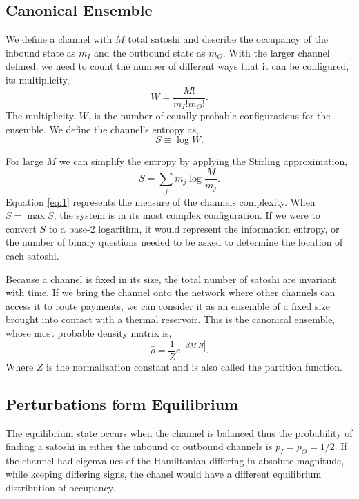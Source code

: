\documentclass[review,12pt]{elsarticle}
\begin{document}
\subsection{Canonical Ensemble}
We define a channel with $M$ total satoshi and describe the occupancy of the inbound state as $m_I$ and the outbound state as $m_O$.
With the larger channel defined, we need to count the number of different ways that it can be configured, its multiplicity,
\begin{equation}
  W = \frac{M!}{m_I!m_O!}. \nonumber
\end{equation}
The multiplicity, $W$, is the number of equally probable configurations for the ensemble.
We define the channel's entropy as,
\begin{equation}
  S \equiv \log W. \nonumber
\end{equation}

For large $M$ we can simplify the entropy by applying the Stirling approximation,
\begin{equation}
  S = \sum_j m_j \log\frac{M}{m_j}.\label{eq:1}
\end{equation}
Equation \ref{eq:1} represents the measure of the channels complexity.
When $S = \max S$, the system is in its most complex configuration.
If we were to convert $S$ to a base-2 logarithm, it would represent the information entropy, or the number of binary questions needed to be asked to determine the location of each satoshi.

Because a channel is fixed in its size, the total number of satoshi are invariant with time.
If we bring the channel onto the network where other channels can access it to route payments, we can consider it as an ensemble of a fixed size brought into contact with a thermal reservoir.
This is the canonical ensemble, whose most probable density matrix is,
\begin{equation}
  \hat{\rho} = \frac{1}{Z}e^{-\beta M \left\lvert \hat{H} \right\rvert}. \nonumber
\end{equation}
Where $Z$ is the normalization constant and is also called the partition function.

\subsection{Perturbations form Equilibrium}
The equilibrium state occurs when the channel is balanced thus the probability of finding a satoshi in either the inbound or outbound channels is $p_I=p_O=1/2$.
If the channel had eigenvalues of the Hamiltonian differing in absolute magnitude, while keeping differing signs, the chanel would have a different equilibrium distribution of occupancy.
\end{document}
